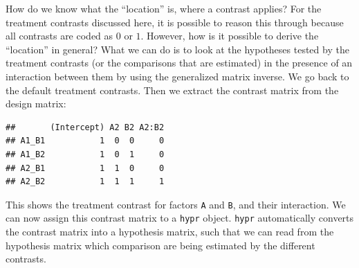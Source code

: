 \documentclass[12pt,]{krantz}
\newenvironment{Shaded}{\begin{snugshade}}{\end{snugshade}}
\newcommand{\DecValTok}[1]{\textcolor[rgb]{0.00,0.00,0.81}{#1}}
\newcommand{\KeywordTok}[1]{\textcolor[rgb]{0.13,0.29,0.53}{\textbf{#1}}}
\newcommand{\NormalTok}[1]{#1}
\newcommand{\OperatorTok}[1]{\textcolor[rgb]{0.81,0.36,0.00}{\textbf{#1}}}
\newcommand{\StringTok}[1]{\textcolor[rgb]{0.31,0.60,0.02}{#1}}
\begin{document}
How do we know what the ``location'' is, where a contrast applies? For the treatment contrasts discussed here, it is possible to reason this through because all contrasts are coded as \(0\) or \(1\). However, how is it possible to derive the ``location'' in general? What we can do is to look at the hypotheses tested by the treatment contrasts (or the comparisons that are estimated) in the presence of an interaction between them by using the generalized matrix inverse. We go back to the default treatment contrasts. Then we extract the contrast matrix from the design matrix:

\begin{Shaded}
\end{Shaded}

\begin{verbatim}
##       (Intercept) A2 B2 A2:B2
## A1_B1           1  0  0     0
## A1_B2           1  0  1     0
## A2_B1           1  1  0     0
## A2_B2           1  1  1     1
\end{verbatim}

This shows the treatment contrast for factors \texttt{A} and \texttt{B}, and their interaction. We can now assign this contrast matrix to a \texttt{hypr} object. \texttt{hypr} automatically converts the contrast matrix into a hypothesis matrix, such that we can read from the hypothesis matrix which comparison are being estimated by the different contrasts.
\end{document}
